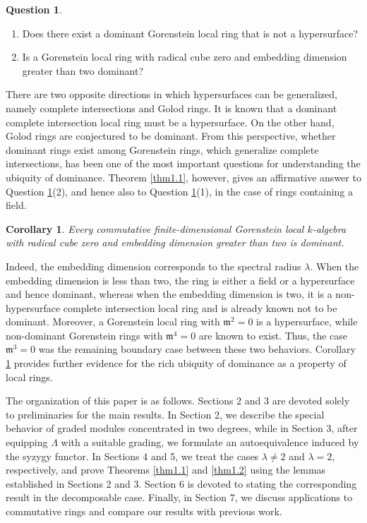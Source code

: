 \documentclass{amsart}
\newtheorem{cor}[thm]{Corollary}
\theoremstyle{definition}
\newtheorem{ques}[thm]{Question}
\theoremstyle{remark}
\numberwithin{equation}{thm}
\def\L{\Lambda}
\def\m{\mathfrak{m}}
\begin{document}
\begin{ques}\label{ques dom Gor intro}
\begin{enumerate}[\rm (1)]
\item Does there exist a dominant Gorenstein local ring that is not a hypersurface?
\item Is a Gorenstein local ring with radical cube zero and embedding dimension greater than two dominant?
\end{enumerate}
\end{ques}

\noindent There are two opposite directions in which hypersurfaces can be generalized, namely complete intersections and Golod rings.
It is known that a dominant complete intersection local ring must be a hypersurface.
On the other hand, Golod rings are conjectured to be dominant.
From this perspective, whether dominant rings exist among Gorenstein rings, which generalize complete intersections, has been one of the most important questions for understanding the ubiquity of dominance.
Theorem \ref{thm1.1}, however, gives an affirmative answer to Question \ref{ques dom Gor intro}(2), and hence also to Question \ref{ques dom Gor intro}(1), in the case of rings containing a field.

\begin{cor}\label{cor1.4}
Every commutative finite-dimensional Gorenstein local $k$-algebra with radical cube zero and embedding dimension greater than two is dominant.
\end{cor}

\noindent Indeed, the embedding dimension corresponds to the spectral radius $\lambda$.
When the embedding dimension is less than two, the ring is either a field or a hypersurface and hence dominant, whereas when the embedding dimension is two, it is a non-hypersurface complete intersection local ring and is already known not to be dominant.
Moreover, a Gorenstein local ring with $\m^2=0$ is a hypersurface, while non-dominant Gorenstein rings with $\m^4=0$ are known to exist.
Thus, the case $\m^3=0$ was the remaining boundary case between these two behaviors.
Corollary \ref{cor1.4} provides further evidence for the rich ubiquity of dominance as a property of local rings.

The organization of this paper is as follows.
Sections 2 and 3 are devoted solely to preliminaries for the main results. 
In Section 2, we describe the special behavior of graded modules concentrated in two degrees, while in Section 3, after equipping $\L$ with a suitable grading, we formulate an autoequivalence induced by the syzygy functor. 
In Sections 4 and 5, we treat the cases $\lambda\ne 2$ and $\lambda=2$, respectively, and prove Theorems \ref{thm1.1} and \ref{thm1.2} using the lemmas established in Sections 2 and 3. 
Section 6 is devoted to stating the corresponding result in the decomposable case. 
Finally, in Section 7, we discuss applications to commutative rings and compare our results with previous work.
\end{document}
